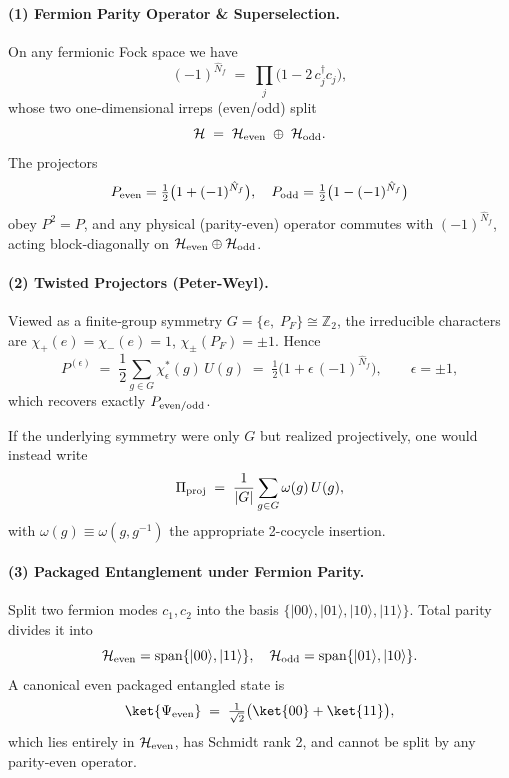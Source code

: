 \documentclass[12pt,a4paper]{article}
\begin{document}
\paragraph{(1) Fermion Parity Operator \& Superselection.}

On any fermionic Fock space we have
\[
(-1)^{\hat N_f}
\;=\;
\prod_j
\bigl(1 - 2\,c_j^\dagger c_j\bigr),
\]
whose two one‐dimensional irreps (even/odd) split
\[
\mathcal H
\;=\;
\mathcal H_{\rm even}
\;\oplus\;
\mathcal H_{\rm odd}.
\]
The projectors
\[
P_{\rm even}
=\tfrac12\bigl(1 + (-1)^{\hat N_f}\bigr),
\quad
P_{\rm odd}
=\tfrac12\bigl(1 - (-1)^{\hat N_f}\bigr)
\]
obey $P^2=P$, and any physical (parity‐even) operator commutes with $(-1)^{\hat N_f}$, acting block‐diagonally on $\mathcal H_{\rm even}\oplus\mathcal H_{\rm odd}$.



\paragraph{(2) Twisted Projectors (Peter-Weyl).}

Viewed as a finite‐group symmetry $G=\{e,\;P_F\}\cong\mathbb Z_2$, the irreducible characters are
$\chi_{+}(e)=\chi_{-}(e)=1$, $\chi_{\pm}(P_F)=\pm1$.
Hence
\[
P^{(\epsilon)}
\;=\;
\frac1{2}\sum_{g\in G}\chi_{\epsilon}^*(g)\,U(g)
\;=\;
\tfrac12\bigl(1 + \epsilon\,(-1)^{\hat N_f}\bigr),
\qquad
\epsilon=\pm1,
\]
which recovers exactly $P_{\rm even/odd}$.

If the underlying symmetry were only $G$ but realized projectively, one would instead write
\[
\Pi_{\rm proj}
\;=\;
\frac1{|G|}\sum_{g\in G}\omega(g)\,U(g),
\]
with $\omega(g)\equiv\omega(g,g^{-1})$ the appropriate 2-cocycle insertion.



\paragraph{(3) Packaged Entanglement under Fermion Parity.}

Split two fermion modes $c_1,c_2$ into the basis
$\{|00\rangle,|01\rangle,|10\rangle,|11\rangle\}$.  
Total parity divides it into
\[
\mathcal H_{\rm even}
=\operatorname{span}\{|00\rangle,|11\rangle\},
\quad
\mathcal H_{\rm odd}
=\operatorname{span}\{|01\rangle,|10\rangle\}.
\]
A canonical even packaged entangled state is
\[
\ket{\Psi_{\rm even}}
\;=\;
\tfrac1{\sqrt2}\bigl(\ket{00}+\ket{11}\bigr),
\]
which lies entirely in $\mathcal H_{\rm even}$, has Schmidt rank 2, and cannot be split by any parity‐even operator.
\end{document}
